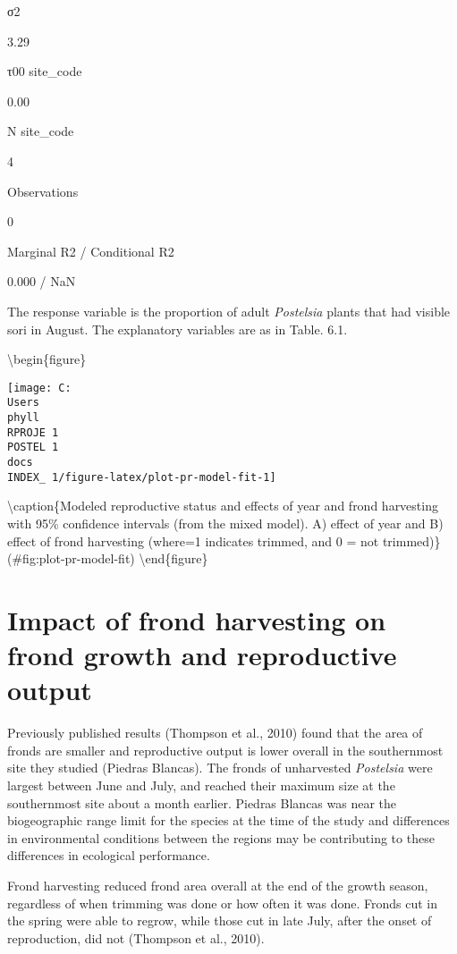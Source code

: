 \documentclass[
]{article}
\begin{document}
σ2

3.29

τ00 site\_code

0.00

N site\_code

4

Observations

0

Marginal R2 / Conditional R2

0.000 / NaN

The response variable is the proportion of adult \emph{Postelsia} plants that had visible sori in August. The explanatory variables are as in Table. 6.1.

\textbackslash begin\{figure\}

\texttt{[image: C:\\Users\\phyll\\RPROJE~1\\POSTEL~1\\docs\\INDEX\_~1/figure-latex/plot-pr-model-fit-1]} \hfill{}

\textbackslash caption\{Modeled reproductive status and effects of year and frond harvesting with 95\% confidence intervals (from the mixed model). A) effect of year and B) effect of frond harvesting (where=1 indicates trimmed, and 0 = not trimmed)\}(\#fig:plot-pr-model-fit)
\textbackslash end\{figure\}
\newpage

\hypertarget{impact-of-frond-harvesting-on-frond-growth-and-reproductive-output}{%
\section{Impact of frond harvesting on frond growth and reproductive output}\label{impact-of-frond-harvesting-on-frond-growth-and-reproductive-output}}

Previously published results (Thompson et al., 2010) found that the area of fronds are smaller and reproductive output is lower overall in the southernmost site they studied (Piedras Blancas). The fronds of unharvested \emph{Postelsia} were largest between June and July, and reached their maximum size at the southernmost site about a month earlier. Piedras Blancas was near the biogeographic range limit for the species at the time of the study and differences in environmental conditions between the regions may be contributing to these differences in ecological performance.

Frond harvesting reduced frond area overall at the end of the growth season, regardless of when trimming was done or how often it was done. Fronds cut in the spring were able to regrow, while those cut in late July, after the onset of reproduction, did not (Thompson et al., 2010).
\end{document}
